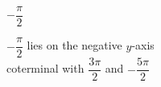 {$-\dfrac{\pi}{2}$}
{$-\dfrac{\pi}{2}$ lies on the negative $y$-axis \\
coterminal with $\dfrac{3\pi}{2}$ and $-\dfrac{5\pi}{2}$

\begin{center}
\end{center}}